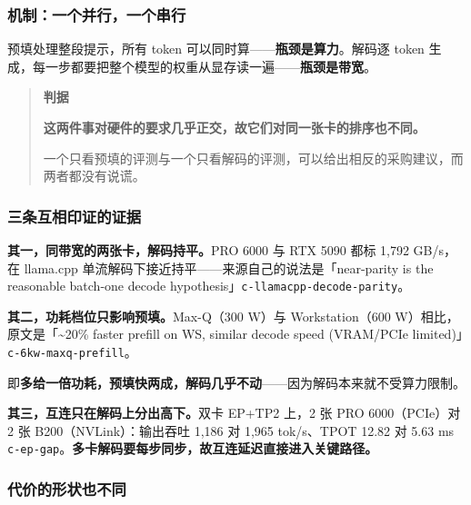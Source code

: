 \subsubsection{机制：一个并行，一个串行}

预填处理整段提示，所有 token 可以同时算——\textbf{瓶颈是算力}。解码逐 token 生成，每一步都要把整个模型的权重从显存读一遍——\textbf{瓶颈是带宽}。


\begin{quote}\small
\textbf{ 判据}

\textbf{这两件事对硬件的要求几乎正交，故它们对同一张卡的排序也不同。}

一个只看预填的评测与一个只看解码的评测，可以给出相反的采购建议，而两者都没有说谎。

\end{quote}

\subsubsection{三条互相印证的证据}

\textbf{其一，同带宽的两张卡，解码持平。}PRO 6000 与 RTX 5090 都标 1,792 GB/s，在 llama.cpp 单流解码下接近持平——来源自己的说法是「near-parity is the reasonable batch-one decode hypothesis」{\scriptsize\texttt{c-\hspace{0pt}llamacpp-\hspace{0pt}decode-\hspace{0pt}parity}}。


\textbf{其二，功耗档位只影响预填。}Max-Q（300 W）与 Workstation（600 W）相比，原文是「\textasciitilde{}20\% faster prefill on WS, similar decode speed (VRAM/PCIe limited)」{\scriptsize\texttt{c-\hspace{0pt}6kw-\hspace{0pt}maxq-\hspace{0pt}prefill}}。


即\textbf{多给一倍功耗，预填快两成，解码几乎不动}——因为解码本来就不受算力限制。


\textbf{其三，互连只在解码上分出高下。}双卡 EP+TP2 上，2 张 PRO 6000（PCIe）对 2 张 B200（NVLink）：输出吞吐 1,186 对 1,965 tok/s、TPOT 12.82 对 5.63 ms {\scriptsize\texttt{c-\hspace{0pt}ep-\hspace{0pt}gap}}。\textbf{多卡解码要每步同步，故互连延迟直接进入关键路径。}


\subsubsection{代价的形状也不同}

